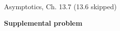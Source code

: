 \documentclass[handout]{mcs}
\begin{document}

\begin{staffnotes}
Asymptotics, Ch. 13.7 (13.6 skipped)
\end{staffnotes}





\begin{center}
\textbf{\large Supplemental problem}
\end{center}





\end{document}
